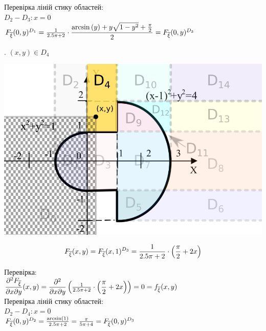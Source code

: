 \documentclass[14pt,a4paper]{scrartcl}
\theoremstyle{definition}
\theoremstyle{remark}
\theoremstyle{definition}
\theoremstyle{definition}
\begin{document}
Перевірка ліній стику областей:\\
$D_2 - D_3: x = 0$\\
$ F_{\overline{\xi}} (0,y)^{D_1} =\frac{1}{2.5\pi + 2} \cdot\dfrac{\arcsin\left(y\right)+y\sqrt{1-y^2} + \frac{\pi}{2} }{2} =F_{\overline{\xi}} (0,y)^{D_3}$

. $(x,y) \in D_4$
\begin{center} \includegraphics[scale=0.4]{assets/zone655.png} \end{center}
$$
F_{\overline{\xi}} (x,y) =  F_{\overline{\xi}} (x, 1)^{D_3} = \frac{1}{2.5\pi + 2} \cdot \left( \dfrac{\pi}{2}+ 2x\right)
$$

Перевірка:\\
$\dfrac{\partial^2 F_{\overline{\xi}}}{\partial x \partial y}(x,y) =
\dfrac{\partial^2}{\partial x \partial y} \left( \frac{1}{2.5\pi + 2} \cdot \left( \dfrac{\pi}{2}+ 2x\right)
\right) = 0 =f_{\overline{\xi}} (x,y)$\\

Перевірка ліній стику областей:\\
$D_2 - D_4: x = 0$\\
$ F_{\overline{\xi}} (0,y)^{D_2} =\frac{\arcsin(1)}{2.5\pi + 2}   = \frac{\pi}{5\pi + 4} = F_{\overline{\xi}} (0,y)^{D_3}$\\
\newpage
\end{document}
